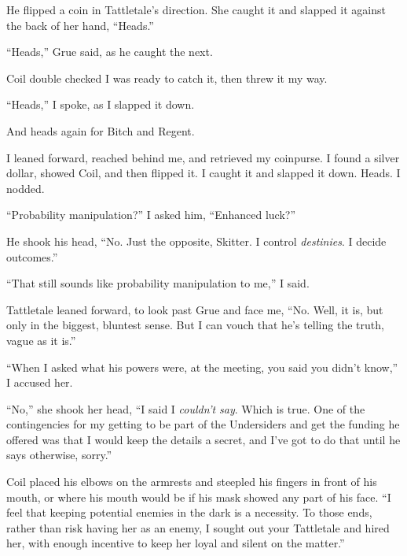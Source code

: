 He flipped a coin in Tattletale's direction.  She caught it and slapped it against the back of her hand, ``Heads.''



``Heads,'' Grue said, as he caught the next.



Coil double checked I was ready to catch it, then threw it my way.



``Heads,'' I spoke, as I slapped it down.



And heads again for Bitch and Regent.



I leaned forward, reached behind me, and retrieved my coinpurse.  I found a silver dollar, showed Coil, and then flipped it.  I caught it and slapped it down.  Heads.  I nodded.



``Probability manipulation?'' I asked him, ``Enhanced luck?''



He shook his head, ``No.  Just the opposite, Skitter.  I control \emph{destinies}.  I decide outcomes.''



``That still sounds like probability manipulation to me,'' I said.



Tattletale leaned forward, to look past Grue and face me, ``No.  Well, it is, but only in the biggest, bluntest sense.  But I can vouch that he's telling the truth, vague as it is.''



``When I asked what his powers were, at the meeting, you said you didn't know,'' I accused her.



``No,'' she shook her head, ``I said I \emph{couldn't say}.  Which is true.  One of the contingencies for my getting to be part of the Undersiders and get the funding he offered was that I would keep the details a secret, and I've got to do that until he says otherwise, sorry.''



Coil placed his elbows on the armrests and steepled his fingers in front of his mouth, or where his mouth would be if his mask showed any part of his face.  ``I feel that keeping potential enemies in the dark is a necessity.  To those ends, rather than risk having her as an enemy, I sought out your Tattletale and hired her, with enough incentive to keep her loyal and silent on the matter.''



